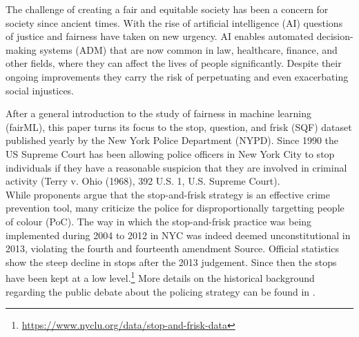 
The challenge of creating a fair and equitable society has been a concern for society since ancient times. With the rise of artificial intelligence (AI) questions of justice and fairness have taken on new urgency. AI enables automated decision-making systems (ADM) that are now common in law, healthcare, finance, and other fields, where they can affect the lives of people significantly. Despite their ongoing improvements they carry the risk of perpetuating and even exacerbating social injustices.\par

After a general introduction to the study of fairness in machine learning (fairML), this paper turns its focus to the stop, question, and frisk (SQF) dataset published yearly by the New York Police Department (NYPD). Since 1990 the US Supreme Court has been allowing police officers in New York City to stop individuals if they have a reasonable suspicion that they are involved in criminal activity (Terry v. Ohio (1968), 392 U.S. 1, U.S. Supreme Court).\\
While proponents argue that the stop-and-frisk strategy is an effective crime prevention tool, many criticize the police for disproportionally targetting people of colour (PoC).
The way in which the stop-and-frisk practice was being implemented during 2004 to 2012 in NYC was indeed deemed unconstitutional in 2013, violating the fourth and fourteenth amendment {\color{red} Source}.
Official statistics show the steep decline in stops after the 2013 judgement. Since then the stops have been kept at a low level.\footnote{\href{https://www.nyclu.org/data/stop-and-frisk-data}{https://www.nyclu.org/data/stop-and-frisk-data}}
More details on the historical background regarding the public debate about the policing strategy can be found in \cite{gelman2007}.\par




